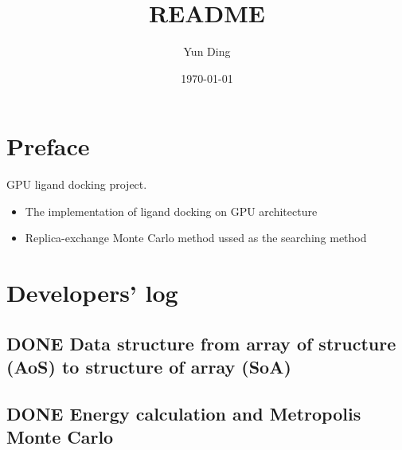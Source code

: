 \documentclass[11pt]{article}
\author{Yun Ding}
\date{\today}
\title{README}
\begin{document}
\maketitle
\tableofcontents

\section{Preface}
\label{sec-1}
GPU ligand docking project.
\begin{itemize}
\item The implementation of ligand docking on GPU architecture
\item Replica-exchange Monte Carlo method ussed as the searching method
\end{itemize}

\section{Developers' log}
\label{sec-2}
\subsection{{\bfseries\sffamily DONE} Data structure from array of structure (AoS) to structure of array (SoA)}
\label{sec-2-1}

\subsection{{\bfseries\sffamily DONE} Energy calculation and Metropolis Monte Carlo}
\label{sec-2-2}
\end{document}
